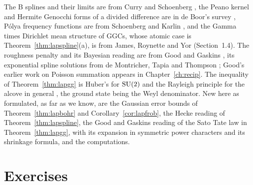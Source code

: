 The B splines and their limits are from Curry and Schoenberg \cite{curryschoenberg1966}, the Peano kernel and Hermite Genocchi forms of a divided difference are in de Boor's survey \cite{deboor2005}, P\'olya frequency functions are from Schoenberg \cite{schoenberg1951} and Karlin \cite{karlin1968}, and the Gamma times Dirichlet mean structure of GGCs, whose atomic case is Theorem~\ref{thm:lapspline}(a), is from James, Roynette and Yor \cite{jamesroynetteyor2008} (Section~1.4). The roughness penalty and its Bayesian reading are from Good and Gaskins \cite{goodgaskins1971,goodgaskins1980}, its exponential spline solutions from de Montricher, Tapia and Thompson \cite{demontrichertapiathompson1975}; Good's earlier work on Poisson summation \cite{good1962} appears in Chapter~\ref{ch:recip}. The inequality of Theorem~\ref{thm:lapgg} is Huber's for $\mathrm{SU}(2)$ \cite{huber1974} and the Rayleigh principle for the alcove in general \cite{berard1980}, the ground state being the Weyl denominator. New here as formulated, as far as we know, are the Gaussian error bounds of Theorem~\ref{thm:lapbohr} and Corollary~\ref{cor:lapfrob}, the Hecke reading of Theorem~\ref{thm:lapspline}, the Good and Gaskins reading of the Sato Tate law in Theorem~\ref{thm:lapgg}, with its expansion in symmetric power characters and its shrinkage formula, and the computations.

\section{Exercises}

